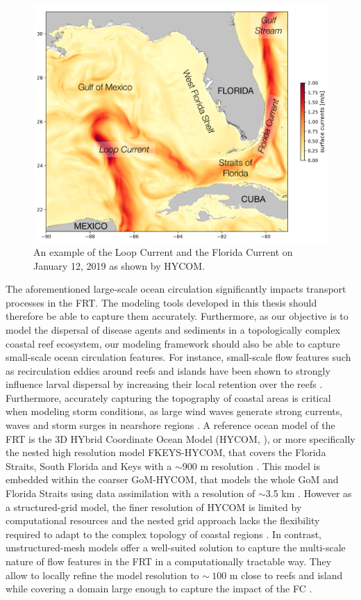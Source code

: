 \begin{figure}
	\centering
	\includegraphics[width=.9\textwidth]{chapters/intro/figures/fig_gom.png}
	\caption{An example of the Loop Current and the Florida Current on January 12, 2019 as shown by HYCOM.}
	\label{intro:gom}
\end{figure}

The aforementioned large-scale ocean circulation significantly impacts transport processes in the FRT. The modeling tools developed in this thesis should therefore be able to capture them accurately. Furthermore, as our objective is to model the dispersal of disease agents and sediments in a topologically complex coastal reef ecosystem, our modeling framework should also be able to capture small-scale ocean circulation features. For instance, small-scale flow features such as recirculation eddies around reefs and islands have been shown to strongly influence larval dispersal by increasing their local retention over the reefs \citep{figueiredo2013synthesizing}. Furthermore, accurately capturing the topography of coastal areas is critical when modeling storm conditions, as large wind waves generate strong currents, waves and storm surges in nearshore regions \citep{dietrich2010high, weisberg2006hurricane}. A reference ocean model of the FRT is the 3D HYbrid Coordinate Ocean Model (HYCOM, \citealp{chassignet2007hycom}), or more specifically the nested high resolution model FKEYS-HYCOM, that covers the Florida Straits, South Florida and Keys with a $\sim$900 m resolution \citep{kourafalou2012florida}. This model is embedded within the coarser GoM-HYCOM, that models the whole GoM and Florida Straits using data assimilation with a resolution of $\sim$3.5 km \citep{cummings2005operational,prasad2007upper}. However as a structured-grid model, the finer resolution of HYCOM is limited by computational resources and the nested grid approach lacks the flexibility required to adapt to the complex topology of coastal regions \citep{fringer2019future}. In contrast, unstructured-mesh models offer a well-suited solution to capture the multi-scale nature of flow features in the FRT in a computationally tractable way. They allow to locally refine the model resolution to $\sim~100$ m close to reefs and island while covering a domain large enough to capture the impact of the FC \citep{lambrechts2008multi,frys2020fine}.


